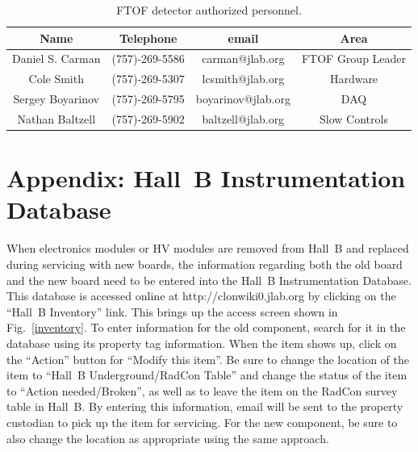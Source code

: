 \documentclass[12pt]{article}
\begin{document}
\begin{table}[htbp]
\begin{center}
\begin{tabular} {|c|c|c|c|} \hline
Name             & Telephone      & email              & Area             \\ \hline \hline
Daniel S. Carman & (757)-269-5586 & carman@jlab.org    & FTOF Group Leader\\ \hline
Cole Smith       & (757)-269-5307 & lcsmith@jlab.org   & Hardware         \\ \hline
Sergey Boyarinov & (757)-269-5795 & boyarinov@jlab.org & DAQ              \\ \hline
Nathan Baltzell  & (757)-269-5902 & baltzell@jlab.org  & Slow Controls    \\ \hline
\end{tabular}
\caption{FTOF detector authorized personnel.}
\label{expert-list}
\end{center}
\end{table}

\clearpage

\vfil
\eject

\section{Appendix: Hall~B Instrumentation Database}

When electronics modules or HV modules are removed from Hall~B and replaced during servicing with
new boards, the information regarding both the old board and the new board need to be entered into
the Hall~B Instrumentation Database. This database is accessed online at http://clonwiki0.jlab.org
by clicking on the ``Hall~B Inventory'' link. This brings up the access screen shown in 
Fig.~\ref{inventory}. To enter information for the old component, search for it in the database 
using its property tag information. When the item shows up, click on the ``Action'' button for
``Modify this item''. Be sure to change the location of the item to ``Hall~B Underground/RadCon 
Table'' and change the status of the item to ``Action needed/Broken'', as well as to leave the item 
on the RadCon survey table in Hall~B. By entering this information, email will be sent to the 
property custodian to pick up the item for servicing. For the new component, be sure to also change 
the location as appropriate using the same approach.
\end{document}
